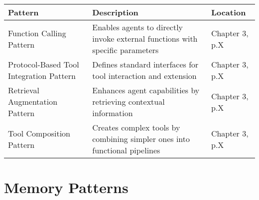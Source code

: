\documentclass[11pt,oneside]{book}
\begin{document}
\begin{longtable}[]{@{}
  >{\raggedright\arraybackslash}p{}
  >{\raggedright\arraybackslash}p{}
  >{\raggedright\arraybackslash}p{}@{}}
\toprule\noalign{}
\begin{minipage}[b]{\linewidth}\raggedright
Pattern
\end{minipage} & \begin{minipage}[b]{\linewidth}\raggedright
Description
\end{minipage} & \begin{minipage}[b]{\linewidth}\raggedright
Location
\end{minipage} \\
\midrule\noalign{}
\endhead
\bottomrule\noalign{}
\endlastfoot
Function Calling Pattern & Enables agents to directly invoke external
functions with specific parameters & Chapter 3, p.X \\
Protocol-Based Tool Integration Pattern & Defines standard interfaces
for tool interaction and extension & Chapter 3, p.X \\
Retrieval Augmentation Pattern & Enhances agent capabilities by
retrieving contextual information & Chapter 3, p.X \\
Tool Composition Pattern & Creates complex tools by combining simpler
ones into functional pipelines & Chapter 3, p.X \\
\end{longtable}

\section{Memory Patterns}\label{memory-patterns}
\end{document}
